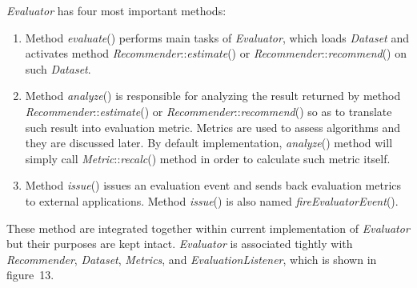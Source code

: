 \documentclass[a4paper]{llncs}
\begin{document}
\textit{Evaluator} has four most important methods:
\begin{enumerate}
\item Method \textit{evaluate}() performs main tasks of \textit{Evaluator}, which loads \textit{Dataset} and activates method \textit{Recommender}::\textit{estimate}() or \textit{Recommender}::\textit{recommend}() on such \textit{Dataset}.
\item Method \textit{analyze}() is responsible for analyzing the result returned by method \textit{Recommender}::\textit{estimate}() or \textit{Recommender}::\textit{recommend}() so as to translate such result into evaluation metric. Metrics are used to assess algorithms and they are discussed later. By default implementation, \textit{analyze}() method will simply call \textit{Metric}::\textit{recalc}() method in order to calculate such metric itself.
\item Method \textit{issue}() issues an evaluation event and sends back evaluation metrics to external applications. Method \textit{issue}() is also named \textit{fireEvaluatorEvent}().
\end{enumerate}
These method are integrated together within current implementation of \textit{Evaluator} but their purposes are kept intact. \textit{Evaluator} is associated tightly with \textit{Recommender}, \textit{Dataset}, \textit{Metrics}, and \textit{EvaluationListener}, which is shown in figure~13.
\end{document}
